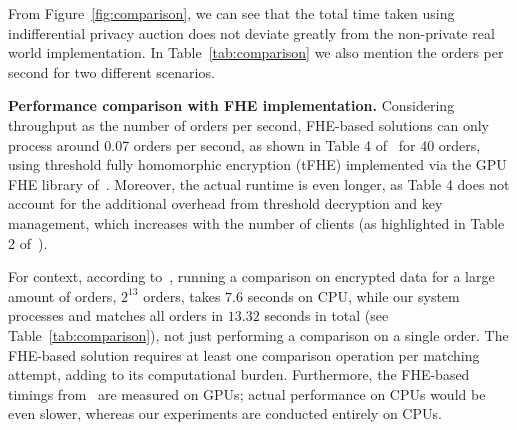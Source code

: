 


From Figure~\ref{fig:comparison}, we can see that the total time taken using indifferential privacy auction does not deviate greatly from the non-private real world implementation. In Table~\ref{tab:comparison} we also mention the orders per second for two different scenarios. 


\noindent \textbf{Performance comparison with FHE implementation.}
Considering throughput as the number of orders per second, FHE-based solutions can only process around 0.07 orders per second, as shown in Table 4 of~\cite{MazloomDPB23} for 40 orders, using threshold fully homomorphic encryption (tFHE) implemented via the GPU FHE library of~\cite{BalchDP20}. Moreover, the actual runtime is even longer, as Table 4 does not account for the additional overhead from threshold decryption and key management, which increases with the number of clients (as highlighted in Table 2 of~\cite{AsharovBPV20}).

For context, according to~\cite{AsharovBPV20}, running a comparison on encrypted data for a large amount of orders, $2^{13}$ orders, takes $7.6$ seconds on CPU, while our system processes and matches all orders in $13.32$ seconds in total (see Table~\ref{tab:comparison}), not just performing a comparison on a single order. The FHE-based solution requires at least one comparison operation per matching attempt, adding to its computational burden. Furthermore, the FHE-based timings from~\cite{MazloomDPB23} are measured on GPUs; actual performance on CPUs would be even slower, whereas our experiments are conducted entirely on CPUs.

